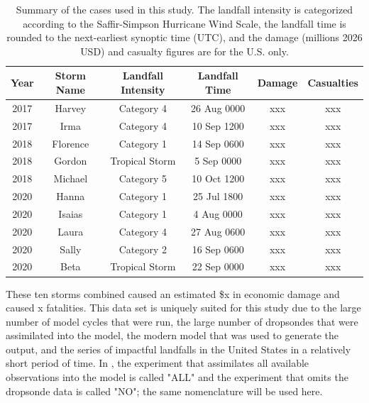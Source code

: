 \documentclass{article}
\begin{document}
\begin{table}
    \centering
    \begin{threeparttable}
      \caption{Summary of the cases used in this study. The landfall intensity is categorized according to the Saffir-Simpson Hurricane Wind Scale, the landfall time is rounded to the next-earliest synoptic time (UTC), and the damage (millions 2026 USD) and casualty figures are for the U.S. only.}
      \label{table:1}
      \begin{tabular}{c c c c c c}
        \hline
        Year & Storm Name & Landfall Intensity & Landfall Time & Damage & Casualties \\
        \hline
        2017 & Harvey     & Category 4         & 26 Aug 0000   & xxx    & xxx \\
        2017 & Irma       & Category 4         & 10 Sep 1200   & xxx    & xxx \\
        2018 & Florence   & Category 1         & 14 Sep 0600   & xxx    & xxx \\
        2018 & Gordon     & Tropical Storm     &  5 Sep 0000   & xxx    & xxx \\
        2018 & Michael    & Category 5         & 10 Oct 1200   & xxx    & xxx \\
        2020 & Hanna      & Category 1         & 25 Jul 1800   & xxx    & xxx \\
        2020 & Isaias     & Category 1         &  4 Aug 0000   & xxx    & xxx \\
        2020 & Laura      & Category 4         & 27 Aug 0600   & xxx    & xxx \\
        2020 & Sally      & Category 2         & 16 Sep 0600   & xxx    & xxx \\
        2020 & Beta       & Tropical Storm     & 22 Sep 0000   & xxx    & xxx \\
        \hline
      \end{tabular}
    \end{threeparttable}
\end{table}

These ten storms combined caused an estimated \$x in economic damage and caused x fatalities. This data set is uniquely suited for this study due to the large number of model cycles that were run, the large number of dropsondes that were assimilated into the model, the modern model that was used to generate the output, and the series of impactful landfalls in the United States in a relatively short period of time. In \cite{DitchekEA2023}, the experiment that assimilates all available observations into the model is called "ALL" and the experiment that omits the dropsonde data is called "NO"; the same nomenclature will be used here. 



\printbibliography{}
\end{document}

